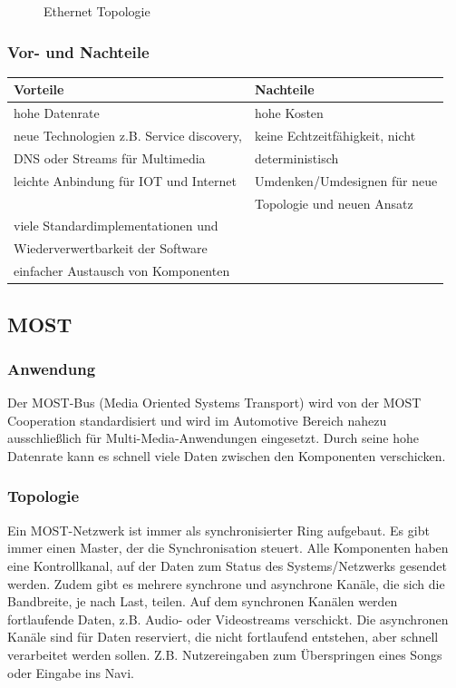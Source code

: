 \begin{figure}[h!]
\begin{subfigure}[b]{0.4\textwidth}
	\end{subfigure}
	\caption{Ethernet Topologie}
\end{figure}

\subsubsection{Vor- und Nachteile}
\begin{tabular}{l|l}
	\textbf{Vorteile} & \textbf{Nachteile}\\
	\hline hohe Datenrate & hohe Kosten\\
	\hline neue Technologien z.B. Service discovery,  & keine Echtzeitfähigkeit, nicht\\
	DNS oder Streams für Multimedia & deterministisch\\
	\hline leichte Anbindung für IOT und Internet & Umdenken/Umdesignen für neue \\
	& Topologie und neuen Ansatz\\
	\hline viele Standardimplementationen und&\\
	Wiederverwertbarkeit der Software&\\
	\hline einfacher Austausch von Komponenten &\\
\end{tabular}

\subsection{MOST}		
\subsubsection{Anwendung}
Der MOST-Bus (Media Oriented Systems Transport) wird von der MOST Cooperation standardisiert und wird im Automotive Bereich nahezu ausschließlich für Multi-Media-Anwendungen eingesetzt. Durch seine hohe Datenrate kann es schnell viele Daten zwischen den Komponenten verschicken.


\cite{.MH_Vehicle}

\subsubsection{Topologie}
Ein MOST-Netzwerk ist immer als synchronisierter Ring aufgebaut. Es gibt immer einen Master, der die Synchronisation steuert. Alle Komponenten haben eine Kontrollkanal, auf der Daten zum Status des Systems/Netzwerks gesendet werden. Zudem gibt es mehrere synchrone und asynchrone Kanäle, die sich die Bandbreite, je nach Last, teilen.
Auf dem synchronen Kanälen werden fortlaufende Daten, z.B. Audio- oder Videostreams verschickt.
Die asynchronen Kanäle sind für Daten reserviert, die nicht fortlaufend entstehen, aber schnell verarbeitet werden sollen. Z.B. Nutzereingaben zum Überspringen eines Songs oder Eingabe ins Navi. \cite{BP01}

